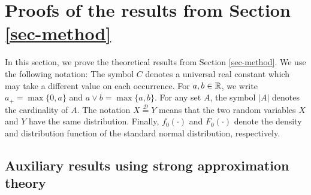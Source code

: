 
\section{Proofs of the results from Section \ref{sec-method}}\label{sec-supp-proofs1}


In this section, we prove the theoretical results from Section \ref{sec-method}. We use the following notation: The symbol $C$ denotes a universal real constant which may take a different value on each occurrence. For $a,b \in \mathbb{R}$, we write $a_+ = \max \{0,a\}$ and $a \vee b = \max\{a,b\}$. For any set $A$, the symbol $|A|$ denotes the cardinality of $A$. The notation $X \stackrel{\mathcal{D}}{=} Y$ means that the two random variables $X$ and $Y$ have the same distribution. Finally, $f_0(\cdot)$ and $F_0(\cdot)$ denote the density and distribution function of the standard normal distribution, respectively.



\subsection*{Auxiliary results using strong approximation theory}


